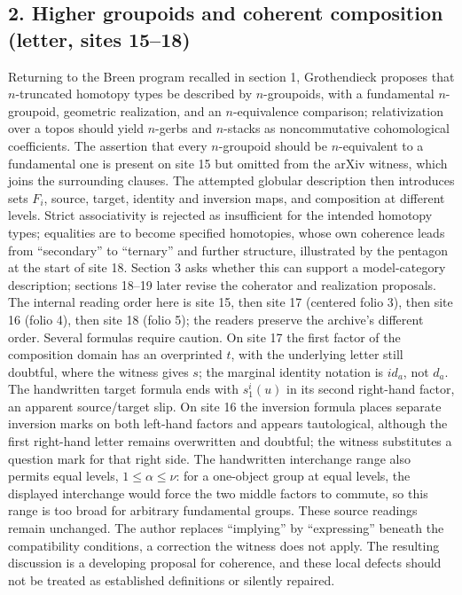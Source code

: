 \subsection*{2. Higher groupoids and coherent composition (letter, sites 15--18)}
Returning to the Breen program recalled in section 1, Grothendieck proposes that $n$-truncated homotopy types be described by $n$-groupoids, with a fundamental $n$-groupoid, geometric realization, and an $n$-equivalence comparison; relativization over a topos should yield $n$-gerbs and $n$-stacks as noncommutative cohomological coefficients. The assertion that every $n$-groupoid should be $n$-equivalent to a fundamental one is present on site 15 but omitted from the arXiv witness, which joins the surrounding clauses. The attempted globular description then introduces sets $F_i$, source, target, identity and inversion maps, and composition at different levels. Strict associativity is rejected as insufficient for the intended homotopy types; equalities are to become specified homotopies, whose own coherence leads from ``secondary'' to ``ternary'' and further structure, illustrated by the pentagon at the start of site 18. Section 3 asks whether this can support a model-category description; sections 18--19 later revise the coherator and realization proposals. The internal reading order here is site 15, then site 17 (centered folio 3), then site 16 (folio 4), then site 18 (folio 5); the readers preserve the archive's different order. Several formulas require caution. On site 17 the first factor of the composition domain has an overprinted $t$, with the underlying letter still doubtful, where the witness gives $s$; the marginal identity notation is $id_a$, not $d_a$. The handwritten target formula ends with $s^i_1(u)$ in its second right-hand factor, an apparent source/target slip. On site 16 the inversion formula places separate inversion marks on both left-hand factors and appears tautological, although the first right-hand letter remains overwritten and doubtful; the witness substitutes a question mark for that right side. The handwritten interchange range also permits equal levels, $1\leq\alpha\leq\nu$: for a one-object group at equal levels, the displayed interchange would force the two middle factors to commute, so this range is too broad for arbitrary fundamental groups. These source readings remain unchanged. The author replaces ``implying'' by ``expressing'' beneath the compatibility conditions, a correction the witness does not apply. The resulting discussion is a developing proposal for coherence, and these local defects should not be treated as established definitions or silently repaired.

